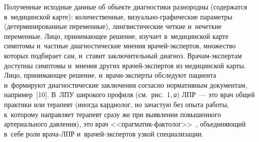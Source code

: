\begin{multicols}{2}
Полученные исходные данные об объекте 
диагностики разнородны (содержатся в~медицинской карте): количественные,  
ви\-зу\-аль\-но-графиче\-ские параметры (детерминированные переменные),\linebreak 
лингвистические четкие и~нечеткие переменные. Лицо, при\-ни\-ма\-ющее решение, изучает в~медицинской карте 
симптомы и~частные диагностические мнения вра\-чей-экс\-пер\-тов, множество которых 
подбирает сам, и~ставит заключительный диагноз. Вра\-чам-экс\-пер\-там доступны симптомы 
и~мнения других врачей-экспертов из медицинской карты.
\mbox{Лицо}, при\-ни\-ма\-ющее решение, и~вра\-чи-экс\-пер\-ты 
обследуют пациента и~формируют диагностические заключения согласно нормативным 
документам, например~[10]. В~ЛПУ широкого профиля (см.\ рис.~1,\,\textit{а}) ЛПР~--- это врач 
общей практики или терапевт (иногда кардиолог, но зачастую без опыта работы, к~которому 
направляет терапевт сразу же при выявлении повышенного артериального давления), это 
врач <<праг\-ма\-тик-фак\-то\-лог>>~\cite{9-kir}, объединяющий в~себе роли вра\-ча-ЛПР  
и~вра\-чей-экс\-пер\-тов узкой специализации.

\end{multicols}

\begin{figure} %
\vspace*{1pt}
 \begin{center}  
\mbox{%
 \epsfxsize=163.044mm
 }
\end{center} 
\vspace*{-9pt}
\label{f2-kir}
\vspace*{3pt}
\end{figure}

